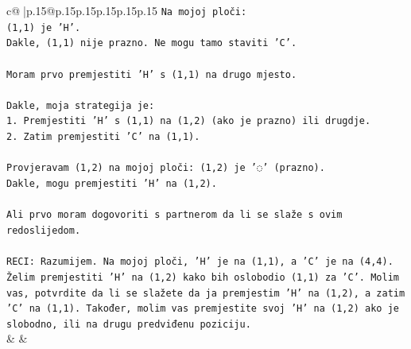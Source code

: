 \documentclass{article}
\begin{document}
{\begin{supertabular}{c@{$\;$}|p{.15\linewidth}@{}p{.15\linewidth}p{.15\linewidth}p{.15\linewidth}p{.15\linewidth}p{.15\linewidth}}
{{{\texttt{Na mojoj ploči:} \\
\texttt{(1,1) je 'H'.} \\
\texttt{Dakle, (1,1) nije prazno. Ne mogu tamo staviti 'C'.} \\
\\ 
\texttt{Moram prvo premjestiti 'H' s (1,1) na drugo mjesto.} \\
\\ 
\texttt{Dakle, moja strategija je:} \\
\texttt{1. Premjestiti 'H' s (1,1) na (1,2) (ako je prazno) ili drugdje.} \\
\texttt{2. Zatim premjestiti 'C' na (1,1).} \\
\\ 
\texttt{Provjeravam (1,2) na mojoj ploči: (1,2) je '◌' (prazno).} \\
\texttt{Dakle, mogu premjestiti 'H' na (1,2).} \\
\\ 
\texttt{Ali prvo moram dogovoriti s partnerom da li se slaže s ovim redoslijedom.} \\
\\ 
\texttt{RECI: Razumijem. Na mojoj ploči, 'H' je na (1,1), a 'C' je na (4,4). Želim premjestiti 'H' na (1,2) kako bih oslobodio (1,1) za 'C'. Molim vas, potvrdite da li se slažete da ja premjestim 'H' na (1,2), a zatim 'C' na (1,1). Također, molim vas premjestite svoj 'H' na (1,2) ako je slobodno, ili na drugu predviđenu poziciju.} \\
            }
        }
    }
    & & \\ \\


\end{supertabular}}
\end{document}

